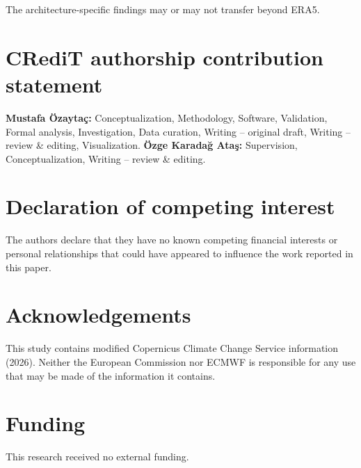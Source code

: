 \documentclass[preprint,12pt]{elsarticle}
\begin{document}
The architecture-specific findings may or may not transfer beyond ERA5.

\section*{CRediT authorship contribution statement}

\textbf{Mustafa Özaytaç:} Conceptualization, Methodology, Software,
Validation, Formal analysis, Investigation, Data curation, Writing --
original draft, Writing -- review \& editing, Visualization.
\textbf{\"{O}zge Karada\u{g} Ata\c{s}:} Supervision, Conceptualization,
Writing -- review \& editing.

\section*{Declaration of competing interest}

The authors declare that they have no known competing financial interests
or personal relationships that could have appeared to influence the
work reported in this paper.

\section*{Acknowledgements}

This study contains modified Copernicus Climate Change Service information
(2026). Neither the European Commission nor ECMWF is responsible for any use
that may be made of the information it contains.

\section*{Funding}

This research received no external funding.

\end{document}
